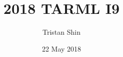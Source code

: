 \documentclass[a4paper, 12pt]{article}
\title{2018 TARML I9}
\author{Tristan Shin}
\date{22 May 2018}
\begin{document}
\maketitle



\hrulefill

\begin{solution}

\end{solution}
\end{document}
